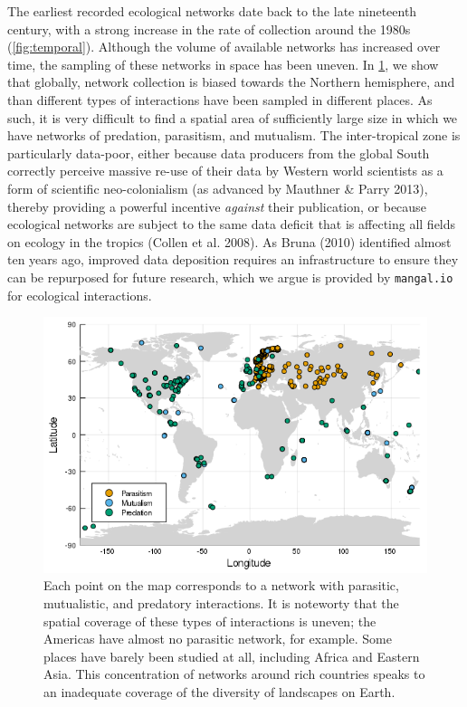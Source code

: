 The earliest recorded ecological networks date back to the late
nineteenth century, with a strong increase in the rate of collection
around the 1980s (\cref{fig:temporal}). Although the
volume of available networks has increased over time, the sampling of
these networks in space has been uneven. In
\cref{fig:spatial}, we show that globally, network
collection is biased towards the Northern hemisphere, and than different
types of interactions have been sampled in different places. As such, it
is very difficult to find a spatial area of sufficiently large size in
which we have networks of predation, parasitism, and mutualism. The
inter-tropical zone is particularly data-poor, either because data
producers from the global South correctly perceive massive re-use of
their data by Western world scientists as a form of scientific
neo-colonialism (as advanced by Mauthner \& Parry 2013), thereby
providing a powerful incentive \emph{against} their publication, or
because ecological networks are subject to the same data deficit that is
affecting all fields on ecology in the tropics (Collen et al. 2008). As
Bruna (2010) identified almost ten years ago, improved data deposition
requires an infrastructure to ensure they can be repurposed for future
research, which we argue is provided by \texttt{mangal.io} for
ecological interactions.

\begin{figure}
\centering
\includegraphics{figures/figure_01_c.png}
\caption{Each point on the map corresponds to a network with parasitic,
mutualistic, and predatory interactions. It is noteworty that the
spatial coverage of these types of interactions is uneven; the Americas
have almost no parasitic network, for example. Some places have barely
been studied at all, including Africa and Eastern Asia. This
concentration of networks around rich countries speaks to an inadequate
coverage of the diversity of landscapes on Earth.\label{fig:spatial}}
\end{figure}

